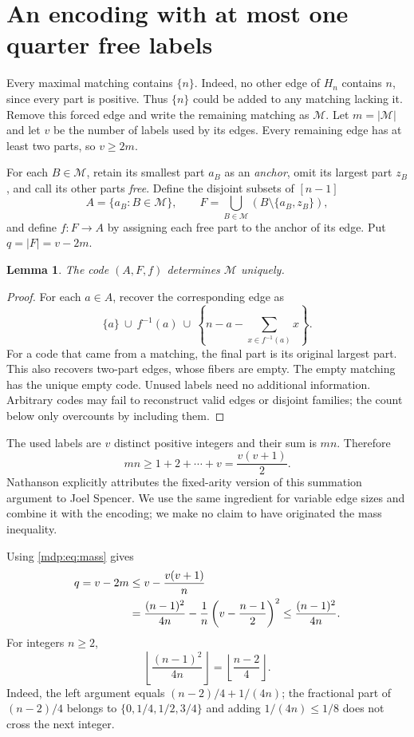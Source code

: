 \documentclass[11pt,letterpaper]{article}
\numberwithin{equation}{section}
\newtheorem{lemma}[theorem]{Lemma}
\theoremstyle{remark}\newtheorem{remark}[theorem]{Remark}
\newcommand{\floor}[1]{\left\lfloor#1\right\rfloor}
\begin{document}
\section{An encoding with at most one quarter free labels}
\label{mdp:sec:upper}
Every maximal matching contains $\{n\}$. Indeed, no other edge of $H_n$
contains $n$, since every part is positive. Thus $\{n\}$ could be added
to any matching lacking it. Remove this forced edge and write the
remaining matching as $\mathcal M$. Let $m=|\mathcal M|$ and let $v$
be the number of labels used by its edges. Every remaining edge has at
least two parts, so $v\ge2m$.

For each $B\in\mathcal M$, retain its smallest part $a_B$ as an
\emph{anchor}, omit its largest part $z_B$, and call its other parts
\emph{free}. Define the disjoint subsets of $[n-1]$
\[
 A=\{a_B:B\in\mathcal M\},\qquad
 F=\bigcup_{B\in\mathcal M}(B\setminus\{a_B,z_B\}),
\]
and define $f:F\to A$ by assigning each free part to the anchor of its
edge. Put $q=|F|=v-2m$.

\begin{lemma}\label{mdp:lem:code}
The code $(A,F,f)$ determines $\mathcal M$ uniquely.
\end{lemma}
\begin{proof}
For each $a\in A$, recover the corresponding edge as
\begin{equation}\label{mdp:eq:decode}
 \{a\}\ \cup\ f^{-1}(a)\ \cup\
 \left\{n-a-\sum_{x\in f^{-1}(a)}x\right\}.
\end{equation}
For a code that came from a matching, the final part is its original
largest part. This also recovers two-part edges, whose fibers are empty.
The empty matching has the unique empty code. Unused labels need no
additional information. Arbitrary codes may fail to reconstruct valid
edges or disjoint families; the count below only overcounts by including
them.
\end{proof}

The used labels are $v$ distinct positive integers and their sum is
$mn$. Therefore
\begin{equation}\label{mdp:eq:mass}
 mn\ge1+2+\cdots+v=\frac{v(v+1)}2.
\end{equation}
Nathanson \cite[p.~108]{nathanson} explicitly attributes the fixed-arity
version of this summation argument to Joel Spencer. We use the same
ingredient for variable edge sizes and combine it with the encoding;
we make no claim to have originated the mass inequality.

Using \eqref{mdp:eq:mass} gives
\begin{align}
 q=v-2m
 &\le v-\frac{v(v+1)}n\notag\\
 &=\frac{(n-1)^2}{4n}
   -\frac1n\left(v-\frac{n-1}{2}\right)^2
 \le\frac{(n-1)^2}{4n}.\label{mdp:eq:qbound}
\end{align}
For integers $n\ge2$,
\begin{equation}\label{mdp:eq:floor}
 \floor{\frac{(n-1)^2}{4n}}=\floor{\frac{n-2}{4}}.
\end{equation}
Indeed, the left argument equals $(n-2)/4+1/(4n)$; the fractional
part of $(n-2)/4$ belongs to $\{0,1/4,1/2,3/4\}$ and adding
$1/(4n)\le1/8$ does not cross the next integer.
\end{document}
